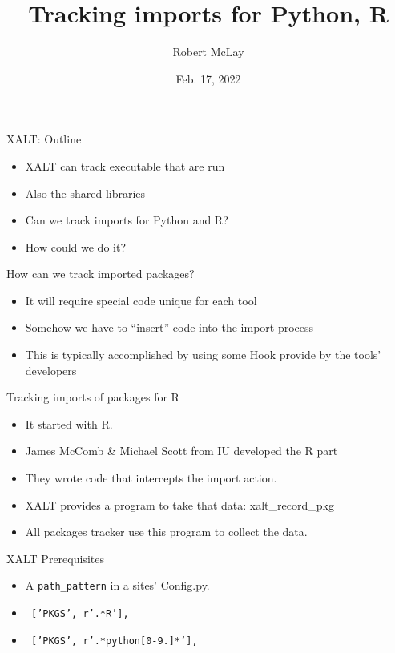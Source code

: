 \documentclass{beamer}
\begin{document}
\title[XALT]{Tracking imports for Python, R}
\author{Robert McLay}
\date{Feb. 17, 2022}

\frame{\titlepage}

\begin{frame}{XALT: Outline}
  \begin{itemize}
    \item XALT can track executable that are run
    \item Also the shared libraries
    \item Can we track imports for Python and R?
    \item How could we do it?
  \end{itemize}
\end{frame}

\begin{frame}{How can we track imported packages?}
  \begin{itemize}
    \item It will require special code unique for each tool
    \item Somehow we have to ``insert'' code into the import process
    \item This is typically accomplished by using some Hook provide by
      the tools' developers
  \end{itemize}
\end{frame}

\begin{frame}{Tracking imports of packages for R}
  \begin{itemize}
    \item It started with R.
    \item James McComb \& Michael Scott from IU developed the R part
    \item They wrote code that intercepts the import action.
    \item XALT provides a program to take that data: xalt\_record\_pkg
    \item All packages tracker use this program to collect the data.
  \end{itemize}
\end{frame}

\begin{frame}{XALT Prerequisites}
  \begin{itemize}
    \item A \texttt{path\_pattern} in a sites' Config.py.
    \item \texttt{ ['PKGS',  r'.*\/R'],}
    \item \texttt{ ['PKGS',  r'.*\/python[0-9.]*'],}
  \end{itemize}
\end{frame}
\end{document}
